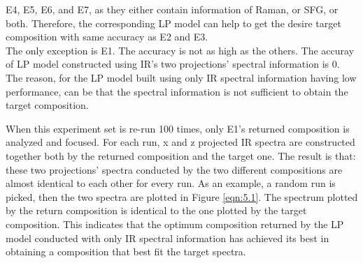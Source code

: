 E4, E5, E6, and E7, as they either contain information of Raman, or SFG, or both. Therefore, the corresponding LP model can help to get the desire target composition with same accuracy as E2 and E3. \\

The only exception is E1. The accuracy is not as high as the others. The accuray of LP model constructed using IR's two projections' spectral information is 0. The reason, for the LP model built using only IR spectral information having low performance, can be that the spectral information is not sufficient to obtain the target composition. 

When this experiment set is re-run 100 times, only E1's returned composition is analyzed and focused. For each run, x and z projected IR spectra are constructed together both by the returned composition and the target one. The result is that: these two projections' spectra conducted by the two different compositions are almost identical to each other for every run. As an example, a random run is picked, then the two spectra are plotted in Figure \ref{eqn:5.1}. The spectrum plotted by the return composition is identical to the one plotted by the target composition. This indicates that the optimum composition returned by the LP model conducted with only IR spectral information has achieved its best in obtaining a composition that best fit the target spectra. 


